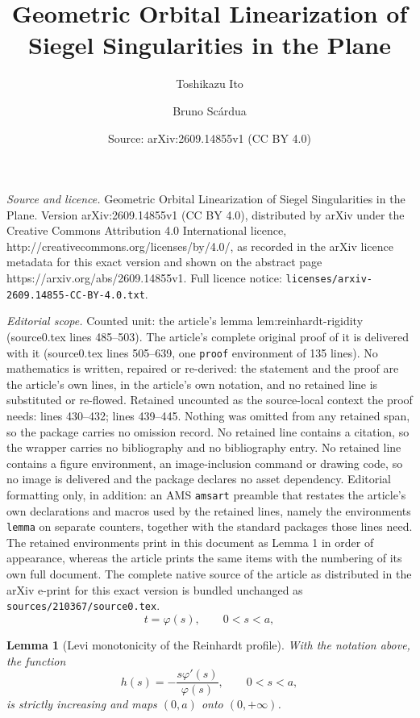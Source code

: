 \documentclass[10pt,a4paper]{amsart}
\title{Geometric Orbital Linearization of Siegel Singularities in the Plane}
\author{Toshikazu Ito \and Bruno Sc\'ardua}
\date{Source: arXiv:2609.14855v1 (CC BY 4.0)}
\newtheorem{lemma}{Lemma}
\begin{document}
\maketitle

\noindent\emph{Source and licence.} Geometric Orbital Linearization of Siegel Singularities in the Plane. Version arXiv:2609.14855v1 (CC BY 4.0), distributed by arXiv under the Creative Commons Attribution 4.0 International licence, http://creativecommons.org/licenses/by/4.0/, as recorded in the arXiv licence metadata for this exact version and shown on the abstract page https://arxiv.org/abs/2609.14855v1. Full licence notice: \texttt{licenses/arxiv-2609.14855-CC-BY-4.0.txt}.\par\smallskip

\noindent\textit{Editorial scope.} Counted unit: the article's lemma lem:reinhardt-rigidity (source0.tex lines 485--503). The article's complete original proof of it is delivered with it (source0.tex lines 505--639, one \texttt{proof} environment of 135 lines). No mathematics is written, repaired or re-derived: the statement and the proof are the article's own lines, in the article's own notation, and no retained line is substituted or re-flowed.  Retained uncounted as the source-local context the proof needs: lines 430--432; lines 439--445.  Nothing was omitted from any retained span, so the package carries no omission record.  No retained line contains a citation, so the wrapper carries no bibliography and no bibliography entry.  No retained line contains a figure environment, an image-inclusion command or drawing code, so no image is delivered and the package declares no asset dependency.  Editorial formatting only, in addition: an AMS \texttt{amsart} preamble that restates the article's own declarations and macros used by the retained lines, namely the environments \texttt{lemma} on separate counters, together with the standard packages those lines need.  The retained environments print in this document as Lemma 1 in order of appearance, whereas the article prints the same items with the numbering of its own full document.  The complete native source of the article as distributed in the arXiv e-print for this exact version is bundled unchanged as \texttt{sources/210367/source0.tex}.
\begin{equation}\label{eq:reinhardt-profile}
 t=\varphi(s),\qquad 0<s<a,
\end{equation}

\begin{lemma}[Levi monotonicity of the Reinhardt profile]\label{lem:reinhardt-profile}
With the notation above, the function
\[
 h(s)=-\frac{s\varphi'(s)}{\varphi(s)},\qquad 0<s<a,
\]
is strictly increasing and maps $(0,a)$ onto $(0,+\infty)$.
\end{lemma}
\end{document}
